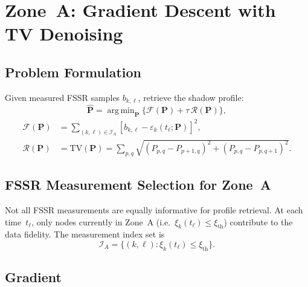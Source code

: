 \documentclass[11pt,a4paper]{article}
\newcommand{\TV}{\mathrm{TV}}
\DeclareMathOperator*{\argmin}{arg\,min}
\begin{document}
\section{Zone~A: Gradient Descent with TV Denoising}
\label{sec:zone_a}

\subsection{Problem Formulation}

Given measured FSSR samples $b_{k,\ell}$, retrieve the shadow
profile:
\begin{equation}
  \hat{\mathbf{P}}=\argmin_{\mathbf{P}}\bigl\{
  \mathcal{F}(\mathbf{P})+\tau\,\mathcal{R}(\mathbf{P})\bigr\},
  \label{eq:opt}
\end{equation}
\begin{align}
  \mathcal{F}(\mathbf{P})
  &=\sum_{(k,\ell)\in\mathcal{I}_A}
  [b_{k,\ell}-\varepsilon_k(t_\ell;\mathbf{P})]^2,
  \label{eq:fidelity}\\
  \mathcal{R}(\mathbf{P})
  &=\TV(\mathbf{P})
  =\sum_{p,q}\sqrt{(P_{p,q}{-}P_{p+1,q})^2
  +(P_{p,q}{-}P_{p,q+1})^2}.
  \label{eq:tv}
\end{align}

\subsection{FSSR Measurement Selection for Zone~A}
\label{sec:measurement_selection}

Not all FSSR measurements are equally informative for profile
retrieval.  At each time~$t_\ell$, only nodes currently in Zone~A
(i.e.\ $\xi_k(t_\ell)\le\xi_{\mathrm{th}}$) contribute to the
data fidelity.  The measurement index set is
\begin{equation}
  \mathcal{I}_A = \bigl\{(k,\ell) :
  \xi_k(t_\ell) \le \xi_{\mathrm{th}}\bigr\}.
  \label{eq:index_set}
\end{equation}

\subsection{Gradient}
\end{document}
